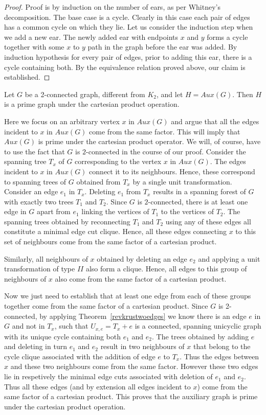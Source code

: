 \documentclass{llncs}
\begin{document}
\begin{proof}
	Proof is by induction on the number of ears, as per Whitney's decomposition. The base case is a cycle. Clearly in this case each pair of edges has a common cycle on which they lie. Let us consider the induction step when we add a new ear. The newly added ear with endpoints $x$ and $y$ forms a cycle together with some $x$ to $y$ path in the graph before the ear was added. By induction hypothesis for every pair of edges, prior to adding this ear, there is a cycle containing both.  By the equivalence relation proved above, our claim is established.
\end{proof}


\begin{theorem}\label{2con}
	Let $G$ be a 2-connected graph, different from $K_2$, and let $H=Aux(G)$. Then $H$ is a prime graph under the cartesian product operation.
\end{theorem}
Here we focus on an arbitrary vertex $x$ in $Aux(G)$ and argue that all the edges incident to $x$ in $Aux(G)$ come from the same factor. This will imply that $Aux(G)$ is prime under the cartesian product operator. We will, of course, have to use the fact that $G$ is $2$-connected in the course of our proof. 
Consider the spanning tree $T_x$ of $G$ corresponding to the vertex $x$ in $Aux(G)$. The edges incident to $x$ in $Aux(G)$ connect it to its neighbours. Hence, these correspond to spanning trees of $G$ obtained from $T_x$ by a single unit transformation. Consider an edge $e_1$ in $T_x$. Deleting $e_1$ from $T_x$ results in a spanning forest of $G$ with exactly two trees $T_1$ and $T_2$. Since $G$ is $2$-connected, there is at least one edge in $G$ apart from $e_1$ linking the vertices of $T_1$ to the vertices of $T_2$. The spanning trees obtained by reconnecting $T_1$ and $T_2$ using any of these edges all constitute a minimal edge cut clique. Hence, all these edges connecting $x$ to this set of neighbours come from the same factor of a cartesian product.

Similarly, all neighbours of $x$ obtained by deleting an edge $e_2$ and applying a unit transformation of type $II$ also form a clique. Hence, all edges to this group of neighbours of $x$ also come from the same factor of a cartesian product. 

Now we just need to establish that at least one edge from each of these groups together come from the same factor of a cartesian product. Since $G$ is 2-connected, by applying Theorem~\ref{revkrustwoedges} we know there is an edge $e$ in $G$ and not in $T_x$, such that $U_{x,e}=T_x+e$ is a connected, spanning unicyclic graph with its unique cycle containing both $e_1$ and $e_2$. The trees obtained by adding $e$ and deleting in turn $e_1$ and $e_2$ result in two neighbours of $x$ that belong to the cycle clique associated with the addition of edge $e$ to $T_x$. Thus the edges between $x$ and these two neighbours come from the same factor. However these two edges lie in respetively the minimal edge cuts associated with deletion of $e_1$ and $e_2$. Thus all these edges (and by extension all edges incident to $x$) come from the same factor of a cartesian product. This proves that the auxiliary graph is prime under the cartesian product operation.
\end{document}
